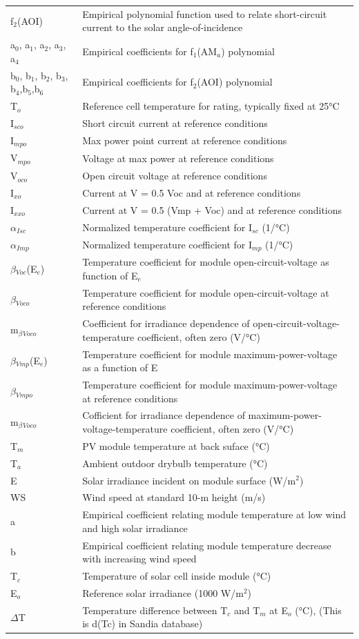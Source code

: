 \begin{longtable}[c]{p{1.2in}p{4.8in}}
f\(_{2}\)(AOI) & Empirical polynomial function used to relate short-circuit current to the solar angle-of-incidence \tabularnewline
a\(_{0}\), a\(_{1}\), a\(_{2}\), a\(_{3}\), a\(_{4}\) & Empirical coefficients for f\(_{1}\)(AM\(_{a}\)) polynomial \tabularnewline
b\(_{0}\), b\(_{1}\), b\(_{2}\), b\(_{3}\), b\(_{4}\),b\(_{5}\),b\(_{6}\) & Empirical coefficients for f\(_{2}\)(AOI) polynomial \tabularnewline
T\(_{o}\) & Reference cell temperature for rating, typically fixed at 25°C \tabularnewline
I\(_{sco}\) & Short circuit current at reference conditions \tabularnewline
I\(_{mpo}\) & Max power point current at reference conditions \tabularnewline
V\(_{mpo}\) & Voltage at max power at reference conditions \tabularnewline
V\(_{oco}\) & Open circuit voltage at reference conditions \tabularnewline
I\(_{xo}\) & Current at V = 0.5 Voc and at reference conditions \tabularnewline
I\(_{xxo}\) & Current at V = 0.5 (Vmp + Voc) and at reference conditions \tabularnewline
$\alpha$\(_{Isc}\) & Normalized temperature coefficient for I\(_{sc}\) (1/°C) \tabularnewline
$\alpha$\(_{Imp}\) & Normalized temperature coefficient for I\(_{mp}\) (1/°C) \tabularnewline
$\beta$\(_{Voc}\)(E\(_{e}\)) & Temperature coefficient for module open-circuit-voltage as function of E\(_{e}\) \tabularnewline
$\beta$\(_{Voco}\) & Temperature coefficient for module open-circuit-voltage at reference conditions \tabularnewline
m\(_{\beta}\)\(_{Voco}\) & Coefficient for irradiance dependence of open-circuit-voltage-temperature coefficient, often zero (V/°C) \tabularnewline
$\beta$\(_{Vmp}\)(E\(_{e}\)) & Temperature coefficient for module maximum-power-voltage as a function of E \tabularnewline
$\beta$\(_{Vmpo}\) & Temperature coefficient for module maximum-power-voltage at reference conditions \tabularnewline
m\(_{\beta}\)\(_{Voco}\) & Cofficient for irradiance dependence of maximum-power-voltage-temperature coefficient, often zero (V/°C) \tabularnewline
T\(_{m}\) & PV module temperature at back suface (°C) \tabularnewline
T\(_{a}\) & Ambient outdoor drybulb temperature (°C) \tabularnewline
E & Solar irradiance incident on module surface (W/m\(^{2}\)) \tabularnewline
WS & Wind speed at standard 10-m height (m/s) \tabularnewline
a & Empirical coefficient relating module temperature at low wind and high solar irradiance \tabularnewline
b & Empirical coefficient relating module temperature decrease with increasing wind speed \tabularnewline
T\(_{c}\) & Temperature of solar cell inside module (°C) \tabularnewline
E\(_{o}\) & Reference solar irradiance (1000 W/m\(^{2}\)) \tabularnewline
$\Delta$T & Temperature difference between T\(_{c}\) and T\(_{m}\) at E\(_{o}\) (°C), (This is d(Tc) in Sandia database) \tabularnewline
\bottomrule
\end{longtable}


